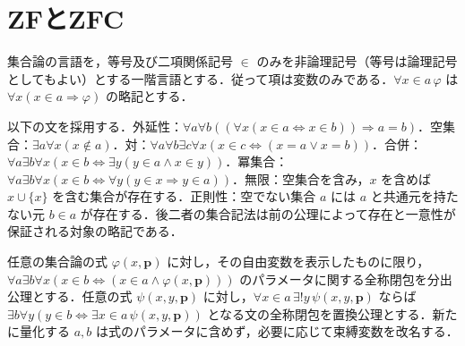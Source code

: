 \section{ZFとZFC}
\begin{defn}[集合論の一階言語]
集合論の言語を，等号及び二項関係記号 $\in$ のみを非論理記号（等号は論理記号としてもよい）とする一階言語とする．従って項は変数のみである．$\forall x\in a\,\varphi$ は $\forall x(x\in a\Rightarrow\varphi)$ の略記とする．
\end{defn}
\begin{axiom}[ZFの集合存在公理]
以下の文を採用する．外延性：$\forall a\forall b((\forall x(x\in a\Leftrightarrow x\in b))\Rightarrow a=b)$．空集合：$\exists a\forall x(x\notin a)$．対：$\forall a\forall b\exists c\forall x(x\in c\Leftrightarrow(x=a\lor x=b))$．合併：$\forall a\exists b\forall x(x\in b\Leftrightarrow\exists y(y\in a\land x\in y))$．冪集合：$\forall a\exists b\forall x(x\in b\Leftrightarrow\forall y(y\in x\Rightarrow y\in a))$．無限：空集合を含み，$x$ を含めば $x\cup\{x\}$ を含む集合が存在する．正則性：空でない集合 $a$ には $a$ と共通元を持たない元 $b\in a$ が存在する．後二者の集合記法は前の公理によって存在と一意性が保証される対象の略記である．
\end{axiom}
\begin{axiom}[分出及び置換の公理図式]
任意の集合論の式 $\varphi(x,\boldsymbol p)$ に対し，その自由変数を表示したものに限り，$\forall a\exists b\forall x(x\in b\Leftrightarrow(x\in a\land\varphi(x,\boldsymbol p)))$ のパラメータに関する全称閉包を分出公理とする．任意の式 $\psi(x,y,\boldsymbol p)$ に対し，$\forall x\in a\,\exists!y\,\psi(x,y,\boldsymbol p)$ ならば $\exists b\forall y(y\in b\Leftrightarrow\exists x\in a\,\psi(x,y,\boldsymbol p))$ となる文の全称閉包を置換公理とする．新たに量化する $a,b$ は式のパラメータに含めず，必要に応じて束縛変数を改名する．
\end{axiom}
